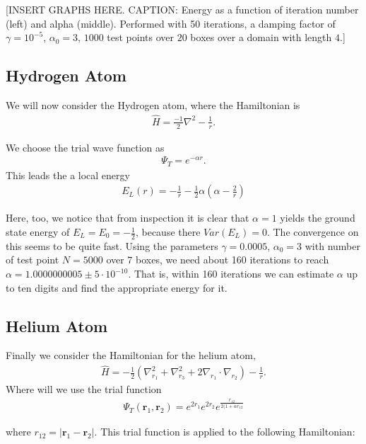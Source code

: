 [INSERT GRAPHS HERE. CAPTION: Energy as a function of iteration number (left) and alpha (middle). Performed with 50 iterations, a damping factor of $\gamma = 10^{-5}$, $\alpha_0 = 3$, $1000$ test points over $20$ boxes over a domain with length $4$.] 
  

\subsection{Hydrogen Atom}
We will now consider the Hydrogen atom, where the Hamiltonian is
\begin{align}
  \hat{H} = \frac{-1}{2}\nabla^2 - \frac{1}{r}.
\end{align}

We choose the trial wave function as
  \begin{align}
    \Psi_T = e^{-\alpha r}.
  \end{align}
This leads the a local energy
  \begin{align}
    E_L(r) = - \frac{1}{r} - \frac{1}{2}\alpha \left(\alpha - \frac{2}{r}\right)
  \end{align}

Here, too, we notice that from inspection it is clear that $\alpha = 1$ yields the ground state energy of $E_L = E_0 = -\frac{1}{2}$, because there $Var(E_L) = 0$. The convergence on this seems to be quite fast. Using the parameters $\gamma = 0.0005$, $\alpha_0 = 3$ with number of test point $N = 5000$ over $7$ boxes, we need about 160 iterations to reach $\alpha = 1.0000000005 \pm 5 \cdot 10^{-10}$. That is, within 160 iterations we can estimate $\alpha$ up to ten digits and find the appropriate energy for it. 




\subsection{Helium Atom}
Finally we consider the Hamiltonian for the helium atom,
\begin{align}
  \hat{H} = -\frac{1}{2}(\nabla_{r_1}^2 + \nabla_{r_3}^2 + 2\nabla_{r_1}\cdot \nabla_{r_2}) - \frac{1}{r}.
\end{align}
Where will we use the trial function
  \begin{align}
    \Psi_T (\textbf{r}_1,\textbf{r}_2) = e^{2r_1}e^{2r_2}e^{\frac{r_{12}}{2(1+\alpha r_{12}}}
  \end{align}

where $r_{12} = |\textbf{r}_1 - \textbf{r}_2 |$. This trial function is applied to the following Hamiltonian:


